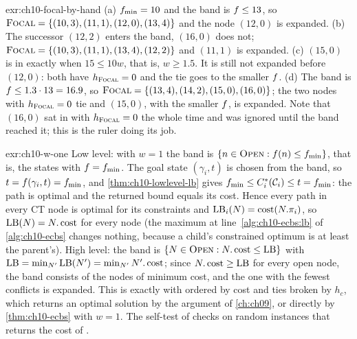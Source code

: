 
\begin{solution}{exr:ch10-focal-by-hand}
(a) $f_{\min}=10$ and the band is $f\le13$, so $\textsc{Focal}=\left\{ (10,3),(11,1),(12,0),(13,4) \right\}$ and the node $(12,0)$ is expanded. (b) The successor $(12,2)$ enters the band, $(16,0)$ does not; $\textsc{Focal}=\left\{ (10,3),(11,1),(13,4),(12,2) \right\}$ and $(11,1)$ is expanded. (c) $(15,0)$ is in \Focal exactly when $15\le10w$, that is, $w\ge1.5$. It is still not expanded before $(12,0)$: both have $h_{\textsc{Focal}}=0$ and the tie goes to the smaller $f$. (d) The band is $f\le1.3\cdot13=16.9$, so $\textsc{Focal}=\left\{ (13,4),(14,2),(15,0),(16,0) \right\}$; the two nodes with $h_{\textsc{Focal}}=0$ tie and $(15,0)$, with the smaller $f$, is expanded. Note that $(16,0)$ sat in \Open with $h_{\textsc{Focal}}=0$ the whole time and was ignored until the band reached it; this is the ruler doing its job.
\end{solution}

\begin{solution}{exr:ch10-w-one}
Low level: with $w=1$ the band is $\left\{ n\in\textsc{Open}:f(n)\le f_{\min} \right\}$, that is, the states with $f=f_{\min}$. The goal state $(\gamma_i,t)$ is chosen from the band, so $t=f(\gamma_i,t)=f_{\min}$, and \cref{thm:ch10-lowlevel-lb} gives $f_{\min}\le C_i^*(\mathcal{C}_i)\le t=f_{\min}$: the path is optimal and the returned bound equals its cost. Hence every path in every CT node is optimal for its constraints and $\mathrm{LB}_i(N)=\operatorname{cost}(N.\pi_i)$, so $\mathrm{LB}(N)=N.\operatorname{cost}$ for every node (the maximum at line~\ref{alg:ch10-ecbs:lb} of \cref{alg:ch10-ecbs} changes nothing, because a child's constrained optimum is at least the parent's). High level: the band is $\left\{ N\in\textsc{Open}:N.\operatorname{cost}\le\mathrm{LB} \right\}$ with $\mathrm{LB}=\min_{N'}\mathrm{LB}(N')=\min_{N'}N'.\operatorname{cost}$; since $N.\operatorname{cost}\ge\mathrm{LB}$ for every open node, the band consists of the nodes of minimum cost, and the one with the fewest conflicts is expanded. This is exactly \cbs with \Open ordered by cost and ties broken by $h_c$, which returns an optimal solution by the argument of \cref{ch:ch09}, or directly by \cref{thm:ch10-ecbs} with $w=1$. The self-test of  checks on random instances that  returns the cost of .
\end{solution}

